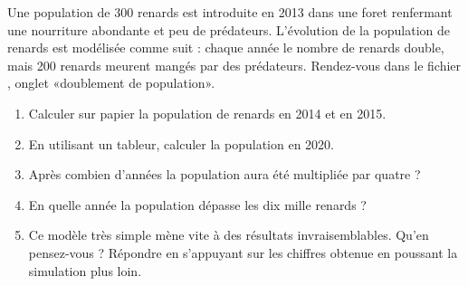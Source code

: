 
\begin{exercice}\label{exosmath-0314}

    Une population de \( 300\) renards est introduite en 2013 dans une foret renfermant une nourriture abondante et peu de prédateurs. L'évolution de la population de renards est modélisée comme suit : chaque année le nombre de renards double, mais 200 renards meurent mangés par des prédateurs. Rendez-vous dans le fichier , onglet «doublement de population». 

    \begin{enumerate}
        \item
            Calculer sur papier la population de renards en 2014 et en 2015.
        \item
            En utilisant un tableur, calculer la population en 2020.
        \item
            Après combien d'années la population aura été multipliée par quatre ?
        \item
            En quelle année la population dépasse les dix mille renards ?
        \item
            Ce modèle très simple mène vite à des résultats invraisemblables. Qu'en pensez-vous ? Répondre en s'appuyant sur les chiffres obtenue en poussant la simulation plus loin.
    \end{enumerate}

\end{exercice}
